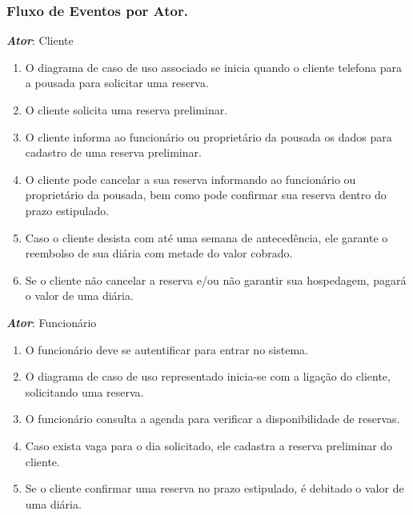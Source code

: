 \documentclass[a4paper,12pt]{article}
\begin{document}
\subsubsection{Fluxo de Eventos por Ator.}
\begin{center}
\end{center}
\textit{\textbf{Ator}}: Cliente 
\begin{enumerate}
\item O diagrama de caso de uso associado se inicia quando o cliente telefona para a pousada para solicitar uma reserva. 
\item O cliente solicita uma reserva preliminar. 
\item O cliente informa ao funcionário ou proprietário da pousada os dados para cadastro de uma reserva preliminar. 
\item O cliente pode cancelar a sua reserva informando ao funcionário ou proprietário da pousada, bem como pode confirmar sua reserva dentro do prazo estipulado. 
\item Caso o cliente desista com até uma semana de antecedência, ele garante o reembolso de sua diária com metade do valor cobrado. 
\item Se o cliente não cancelar a reserva e/ou não garantir sua hospedagem, pagará o valor de uma diária.
\end{enumerate}

\begin{center}
\end{center}
\textit{\textbf{Ator}}: Funcionário 
\begin{enumerate}
\item O funcionário deve se autentificar para entrar no sistema. 
\item O diagrama de caso de uso representado inicia-se com a ligação do cliente, solicitando uma reserva. 
\item O funcionário consulta a agenda para verificar a disponibilidade de reservas. 
\item Caso exista vaga para o dia solicitado, ele cadastra a reserva preliminar do cliente. 
\item Se o cliente confirmar uma reserva no prazo estipulado, é debitado o valor de uma diária. 
\end{enumerate} 
\end{document}
